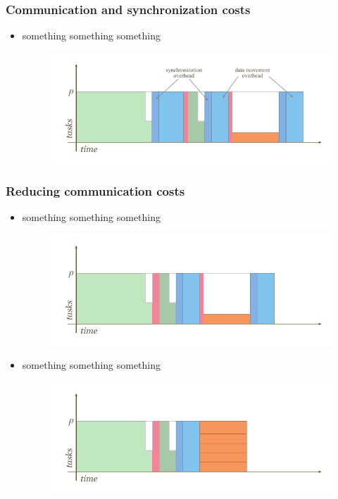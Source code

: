 \begin{frame}[fragile]
%
  \frametitle{Communication and synchronization costs}
%
  \begin{itemize}
%
  \item something something something 
    \begin{figure}
      \centering
      \includegraphics[scale=1.0]{figures/reduction-comsync.pdf}
    \end{figure}
%
  \end{itemize}
%
\end{frame}

\begin{frame}[fragile]
%
  \frametitle{Reducing communication costs}
%
  \begin{itemize}
%
  \item something something something 
    \begin{figure}
      \centering
      \includegraphics[scale=0.6]{figures/reduction-comsync-replication.pdf}
    \end{figure}
%
  \item something something something 
    \begin{figure}
      \centering
      \includegraphics[scale=0.6]{figures/reduction-comsync-redundancy.pdf}
    \end{figure}
%
  \end{itemize}
%
\end{frame}

